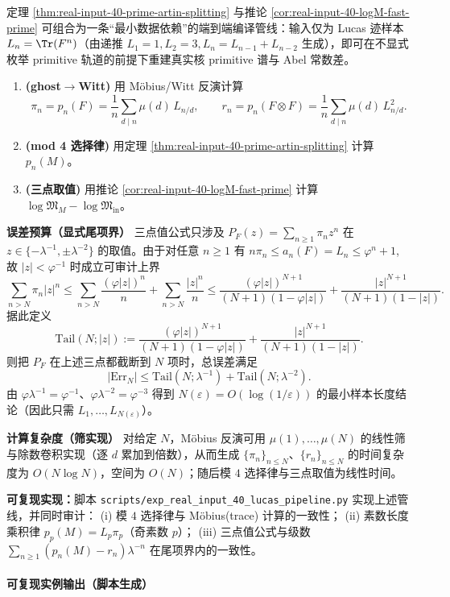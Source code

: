 \begin{remark}\label{rem:real-input-40-lucas-pipeline}
定理 \ref{thm:real-input-40-prime-artin-splitting} 与推论 \ref{cor:real-input-40-logM-fast-prime} 可组合为一条“最小数据依赖”的端到端编译管线：输入仅为 Lucas 迹样本 \(L_n=\Tr(F^n)\)（由递推 \(L_1=1,L_2=3,L_n=L_{n-1}+L_{n-2}\) 生成），即可在不显式枚举 primitive 轨道的前提下重建真实核 primitive 谱与 Abel 常数差。
\begin{enumerate}
  \item \textbf{(ghost\(\to\)Witt)} 用 Möbius/Witt 反演计算
  \[
  \pi_n=p_n(F)=\frac1n\sum_{d\mid n}\mu(d)\,L_{n/d},
  \qquad
  r_n=p_n(F\otimes F)=\frac1n\sum_{d\mid n}\mu(d)\,L_{n/d}^2.
  \]
  \item \textbf{(mod 4 选择律)} 用定理 \ref{thm:real-input-40-prime-artin-splitting} 计算 \(p_n(M)\)。
  \item \textbf{(三点取值)} 用推论 \ref{cor:real-input-40-logM-fast-prime} 计算
  \(\log\mathfrak{M}_M-\log\mathfrak{M}_{\mathrm{in}}\)。
\end{enumerate}
\par
\textbf{误差预算（显式尾项界）} 三点值公式只涉及 \(P_F(z)=\sum_{n\ge 1}\pi_n z^n\) 在
\(z\in\{-\lambda^{-1},\pm\lambda^{-2}\}\) 的取值。由于对任意 \(n\ge 1\) 有
\(
n\pi_n\le a_n(F)=L_n\le \varphi^n+1
\),
故 \(|z|<\varphi^{-1}\) 时成立可审计上界
\[
\sum_{n>N}\pi_n|z|^n
\le \sum_{n>N}\frac{(\varphi|z|)^n}{n}+\sum_{n>N}\frac{|z|^n}{n}
\le \frac{(\varphi|z|)^{N+1}}{(N+1)(1-\varphi|z|)}+\frac{|z|^{N+1}}{(N+1)(1-|z|)}.
\]
据此定义
\[
\mathrm{Tail}(N;|z|):=\frac{(\varphi|z|)^{N+1}}{(N+1)(1-\varphi|z|)}+\frac{|z|^{N+1}}{(N+1)(1-|z|)}.
\]
则把 \(P_F\) 在上述三点都截断到 \(N\) 项时，总误差满足
\[
\bigl|\mathrm{Err}_N\bigr|
\le \mathrm{Tail}(N;\lambda^{-1})+\mathrm{Tail}(N;\lambda^{-2}).
\]
由 \(\varphi\lambda^{-1}=\varphi^{-1}\)、\(\varphi\lambda^{-2}=\varphi^{-3}\) 得到
\(
N(\varepsilon)=O(\log(1/\varepsilon))
\)
的最小样本长度结论（因此只需 \(L_1,\dots,L_{N(\varepsilon)}\)）。
\par
\textbf{计算复杂度（筛实现）} 对给定 \(N\)，Möbius 反演可用 \(\mu(1),\dots,\mu(N)\) 的线性筛与除数卷积实现（逐 \(d\) 累加到倍数），从而生成 \(\{\pi_n\}_{n\le N}\)、\(\{r_n\}_{n\le N}\) 的时间复杂度为 \(O(N\log N)\)，空间为 \(O(N)\)；随后模 \(4\) 选择律与三点取值为线性时间。
\par
\textbf{可复现实现：}脚本 \texttt{scripts/exp\_real\_input\_40\_lucas\_pipeline.py} 实现上述管线，并同时审计：
(i) 模 \(4\) 选择律与 Möbius(trace) 计算的一致性；
(ii) 素数长度乘积律 \(p_p(M)=L_p\pi_p\)（奇素数 \(p\)）；
(iii) 三点值公式与级数 \(\sum_{n\ge 1}(p_n(M)-r_n)\lambda^{-n}\) 在尾项界内的一致性。
\end{remark}

\paragraph{可复现实例输出（脚本生成）}



